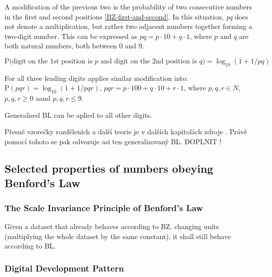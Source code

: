 A modification of the previous two is the probability of two consecutive numbers in the first and second positions \ref{BZ-first-and-second}. In this situation, \textit{pq} does not denote a multiplication, but rather two adjacent numbers together forming a two-digit number. This can be expressed as $pq = p \cdot 10 + q \cdot 1$, where $p$ and $q$ are both natural numbers, both between 0 and 9. 

\begin{equation}
    \label{BZ-first-and-second}
\text{P(digit on the 1st position is } p \text{ and digit on the 2nd position is } q \text{)}= \log_{10}(1+1/pq)
\end{equation}

For all three leading digits applies similar modification into: $ \text{P}(pqr) = \log_{10}(1+1/pqr)$,  $pqr = p \cdot 100 + q \cdot 10 + r \cdot 1$, where $p,q,r \in N$, $p,q,r \ge 0$ aand $p,q,r \le 9$. 

Generalised BL can be aplied to all other digits.  \cite{kossovsky2014benford}

\begin{koment}
Přesné vzorečky rozděleních a další teorie je v dalších kapitolách zdroje \cite{kossovsky2014benford}. Právě pomocí tohoto se pak odvozuje asi ten generalizovaný BL. DOPLNIT ! 
\end{koment}


\subsection{Selected properties of numbers obeying Benford's Law}

\subsubsection{The Scale Invariance Principle of Benford's Law}


Given a dataset that already behaves according to BZ, changing units (multiplying the whole dataset by the same constant), it shall still behave according to BL. \cite{kossovsky2014benford} %

\subsubsection{Digital Development Pattern}

